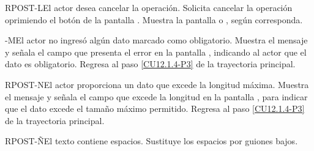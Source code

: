	\begin{UCtrayectoriaA}{RPOST-L}{El actor desea cancelar la operación.}
		\UCpaso[\UCactor] Solicita cancelar la operación oprimiendo el botón  de la pantalla .
		\UCpaso[\UCsist] Muestra la pantalla  o , según corresponda.
	\end{UCtrayectoriaA}

	\begin{UCtrayectoriaA}{-M}{El actor no ingresó algún dato marcado como obligatorio.}
		\UCpaso[\UCsist] Muestra el mensaje  y señala el campo que presenta el error en la pantalla , indicando al actor que el dato es obligatorio.
		\UCpaso Regresa al paso \ref{CU12.1.4-P3} de la trayectoria principal.
	\end{UCtrayectoriaA}

	\begin{UCtrayectoriaA}{RPOST-N}{El actor proporciona un dato que excede la longitud máxima.}
		\UCpaso[\UCsist] Muestra el mensaje  y señala el campo que excede la longitud en la pantalla , para indicar que el dato excede el tamaño máximo permitido.
		\UCpaso Regresa al paso \ref{CU12.1.4-P3} de la trayectoria principal.
	\end{UCtrayectoriaA}

	\begin{UCtrayectoriaA}{RPOST-Ñ}{El texto contiene espacios.}
		\UCpaso[\UCsist] Sustituye los espacios por guiones bajos.
	\end{UCtrayectoriaA}